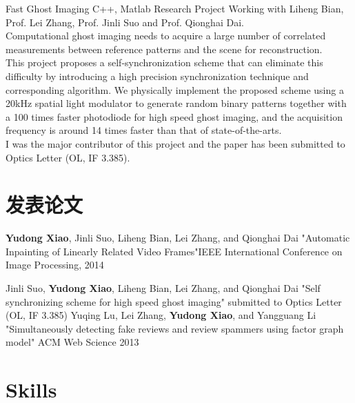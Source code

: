 \documentclass[11pt,a4paper]{moderncv}
\begin{document}
\vspace*{0.2\baselineskip}
{Fast Ghost Imaging}
{C++, Matlab}
{Research Project}{}
{Working with Liheng Bian, Prof. Lei Zhang, Prof. Jinli Suo and Prof. Qionghai Dai. \\
	Computational ghost imaging needs to acquire a large number of correlated measurements between reference patterns and the scene for reconstruction.\\
	This project proposes a self-synchronization scheme that can eliminate this difficulty by introducing a high precision synchronization technique and corresponding algorithm. We physically implement the proposed scheme using a 20kHz spatial light modulator to generate random binary patterns together with a 100 times faster photodiode for high speed ghost imaging, and the acquisition frequency is around 14 times faster than that of state-of-the-arts. \\
	I was the major contributor of this project and the paper has been submitted to Optics Letter (OL, IF 3.385).
}

\renewcommand{\baselinestretch}{1.0}

\section{发表论文}
{\textbf{Yudong Xiao}\textnormal{, Jinli Suo, Liheng Bian, Lei Zhang, and Qionghai Dai}}
{"Automatic Inpainting of Linearly Related Video Frames"}{IEEE International Conference on Image Processing, 2014}
{}{}{}

{\textnormal{Jinli Suo, }\textbf{Yudong Xiao}\textnormal{, Liheng Bian, Lei Zhang, and Qionghai Dai}}
{"Self synchronizing scheme for high speed ghost imaging"}
{submitted to Optics Letter (OL, IF 3.385)}
{}{}{}
{\textnormal{Yuqing Lu, Lei Zhang, }\textbf{Yudong Xiao}\textnormal{, and Yangguang Li}}
{"Simultaneously detecting fake reviews and review spammers using factor graph model"}
{ACM Web Science 2013}
{}{}{}

\section{Skills}
\end{document}
